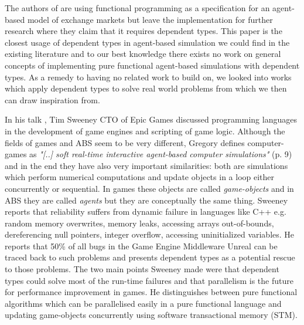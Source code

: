 The authors of \cite{botta_functional_2011} are using functional programming as a specification for an agent-based model of exchange markets but leave the implementation for further research where they claim that it requires dependent types. This paper is the closest usage of dependent types in agent-based simulation we could find in the existing literature and to our best knowledge there exists no work on general concepts of implementing pure functional agent-based simulations with dependent types. As a remedy to having no related work to build on, we looked into works which apply dependent types to solve real world problems from which we then can draw inspiration from.

In his talk \cite{sweeney_next_2006}, Tim Sweeney CTO of Epic Games discussed programming languages in the development of game engines and scripting of game logic. Although the fields of games and ABS seem to be very different, Gregory \cite{gregory_game_2018} defines computer-games as \textit{"[..] soft real-time interactive agent-based computer simulations"} (p. 9) and in the end they have also very important similarities: both are simulations which perform numerical computations and update objects in a loop either concurrently or sequential. In games these objects are called \textit{game-objects} and in ABS they are called \textit{agents} but they are conceptually the same thing.  Sweeney reports that reliability suffers from dynamic failure in languages like C++ e.g. random memory overwrites, memory leaks, accessing arrays out-of-bounds, dereferencing null pointers, integer overflow, accessing uninitialized variables. He reports that 50\% of all bugs in the Game Engine Middleware Unreal can be traced back to such problems and presents dependent types as a potential rescue to those problems. The two main points Sweeney made were that dependent types could solve most of the run-time failures and that parallelism is the future for performance improvement in games. He distinguishes between pure functional algorithms which can be parallelised easily in a pure functional language and updating game-objects concurrently using software transactional memory (STM).